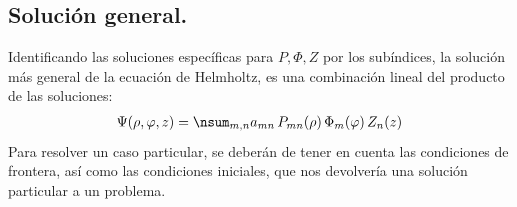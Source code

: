 \subsection{Solución general.}

Identificando las soluciones específicas para $P, \Phi, Z$ por los subíndices, la solución más general de la ecuación de Helmholtz, es una combinación lineal del producto de las soluciones:
\begin{align}
\Psi (\rho, \varphi, z) =  \nsum_{m,n} a_{mn} \, P_{mn}(\rho) \, \Phi_{m}(\varphi) \, Z_{n}(z)
\label{eq:ecuacion_09_56}
\end{align}
Para resolver un caso particular, se deberán de tener en cuenta las condiciones de frontera, así como las condiciones iniciales, que nos devolvería una solución particular a un problema.